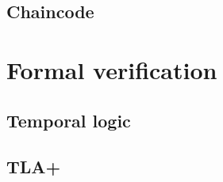 \documentclass[english, biblatex, digitaloutput]{kththesis}
\begin{document}
\subsection{Chaincode}


\section{Formal verification}

\subsection{Temporal logic}

\subsection{TLA+}





\end{document}
